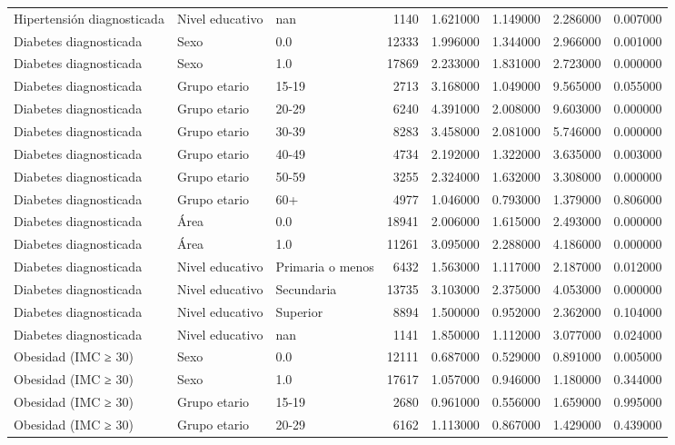 \begin{longtable}{lllrrrrr}
Hipertensión diagnosticada & Nivel educativo & nan & 1140 & 1.621000 & 1.149000 & 2.286000 & 0.007000 \\
Diabetes diagnosticada & Sexo & 0.0 & 12333 & 1.996000 & 1.344000 & 2.966000 & 0.001000 \\
Diabetes diagnosticada & Sexo & 1.0 & 17869 & 2.233000 & 1.831000 & 2.723000 & 0.000000 \\
Diabetes diagnosticada & Grupo etario & 15-19 & 2713 & 3.168000 & 1.049000 & 9.565000 & 0.055000 \\
Diabetes diagnosticada & Grupo etario & 20-29 & 6240 & 4.391000 & 2.008000 & 9.603000 & 0.000000 \\
Diabetes diagnosticada & Grupo etario & 30-39 & 8283 & 3.458000 & 2.081000 & 5.746000 & 0.000000 \\
Diabetes diagnosticada & Grupo etario & 40-49 & 4734 & 2.192000 & 1.322000 & 3.635000 & 0.003000 \\
Diabetes diagnosticada & Grupo etario & 50-59 & 3255 & 2.324000 & 1.632000 & 3.308000 & 0.000000 \\
Diabetes diagnosticada & Grupo etario & 60+ & 4977 & 1.046000 & 0.793000 & 1.379000 & 0.806000 \\
Diabetes diagnosticada & Área & 0.0 & 18941 & 2.006000 & 1.615000 & 2.493000 & 0.000000 \\
Diabetes diagnosticada & Área & 1.0 & 11261 & 3.095000 & 2.288000 & 4.186000 & 0.000000 \\
Diabetes diagnosticada & Nivel educativo & Primaria o menos & 6432 & 1.563000 & 1.117000 & 2.187000 & 0.012000 \\
Diabetes diagnosticada & Nivel educativo & Secundaria & 13735 & 3.103000 & 2.375000 & 4.053000 & 0.000000 \\
Diabetes diagnosticada & Nivel educativo & Superior & 8894 & 1.500000 & 0.952000 & 2.362000 & 0.104000 \\
Diabetes diagnosticada & Nivel educativo & nan & 1141 & 1.850000 & 1.112000 & 3.077000 & 0.024000 \\
Obesidad (IMC ≥ 30) & Sexo & 0.0 & 12111 & 0.687000 & 0.529000 & 0.891000 & 0.005000 \\
Obesidad (IMC ≥ 30) & Sexo & 1.0 & 17617 & 1.057000 & 0.946000 & 1.180000 & 0.344000 \\
Obesidad (IMC ≥ 30) & Grupo etario & 15-19 & 2680 & 0.961000 & 0.556000 & 1.659000 & 0.995000 \\
Obesidad (IMC ≥ 30) & Grupo etario & 20-29 & 6162 & 1.113000 & 0.867000 & 1.429000 & 0.439000 \\

\end{longtable}
